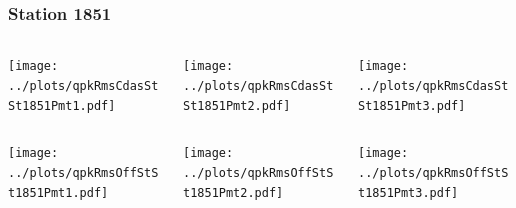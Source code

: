 \documentclass[aspectratio=169]{beamer}
\begin{document}
\begin{frame} 
  \frametitle{Station 1851}
  \begin{center}
    \begin{columns}
      \begin{column}{0.33\textwidth}
        \texttt{[image: ../plots/qpkRmsCdasStSt1851Pmt1.pdf]}
      \end{column}
      \begin{column}{0.33\textwidth}
        \texttt{[image: ../plots/qpkRmsCdasStSt1851Pmt2.pdf]}
      \end{column}
      \begin{column}{0.33\textwidth}
        \texttt{[image: ../plots/qpkRmsCdasStSt1851Pmt3.pdf]}
      \end{column}
    \end{columns}
  \end{center}

  \begin{center}
    \begin{columns}
      \begin{column}{0.33\textwidth}
        \texttt{[image: ../plots/qpkRmsOffStSt1851Pmt1.pdf]}
      \end{column}
      \begin{column}{0.33\textwidth}
        \texttt{[image: ../plots/qpkRmsOffStSt1851Pmt2.pdf]}
      \end{column}
      \begin{column}{0.33\textwidth}
        \texttt{[image: ../plots/qpkRmsOffStSt1851Pmt3.pdf]}
      \end{column}
    \end{columns}
  \end{center}
\end{frame}
\end{document}
